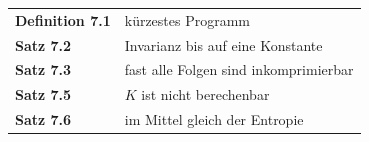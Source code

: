 \begin{merksatz}
\begin{center}
\renewcommand{\arraystretch}{1.5}
\begin{tabular}{@{}P{3.0cm}P{5.6cm}@{}}
\toprule
\textbf{Definition 7.1} & kürzestes Programm\\
\textbf{Satz 7.2} & Invarianz bis auf eine Konstante\\
\textbf{Satz 7.3} & fast alle Folgen sind inkomprimierbar\\
\textbf{Satz 7.5} & $K$ ist nicht berechenbar\\
\textbf{Satz 7.6} & im Mittel gleich der Entropie\\
\bottomrule
\end{tabular}
\end{center}

\begin{center}
\begin{minipage}{0.88\textwidth}
\end{minipage}
\end{center}
\end{merksatz}
